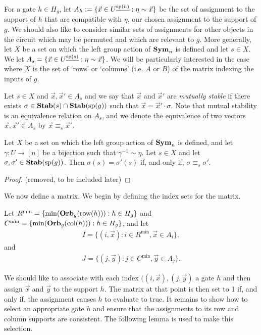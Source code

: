 \documentclass[../paper.tex]{subfiles}
\begin{document}
For a gate $h \in H_g$, let $A_h := \{\vec{x} \in U^{\underline{\text{sp}(h)}} :
\eta \sim \vec{x}\}$ be the set of assignment to the support of $h$ that are
compatible with $\eta$, our chosen assignment to the support of $g$. We should
also like to consider similar sets of assignments for other objects in the
circuit which may be permuted and which are relevant to $g$. More generally, let
$X$ be a set on which the left group action of $\text{\textbf{Sym}}_n$ is defined and let $s
\in X$. We let $A_s = \{\vec{x} \in U^{\underline{\text{sp}(s)}} : \eta \sim
\vec{x}\}$. We will be particularly interested in the case where $X$ is the set
of `rows' or `columns' (i.e. $A$ or $B$) of the matrix indexing the inputs of
$g$.

Let $s \in X$ and $\vec{x}, \vec{x}' \in A_s$ and we say that $\vec{x}$ and
$\vec{x}'$ are \emph{mutually stable} if there exists $\sigma \in \text{\textbf{Stab}}(s) \cap
\text{\textbf{Stab}} (\text{sp} (g))$ such that $\vec{x} = \vec{x}' \cdot \sigma$. Note that mutual
stability is an equivalence relation on $A_s$, and we denote the equivalence of
two vectors $\vec{x}, \vec{x}' \in A_s$ by $\vec{x} \equiv_s \vec{x}'$.

\begin{lem}
  Let $X$ be a set on which the left group action of $\text{\textbf{Sym}}_n$ is defined, and
  let $\gamma: U \rightarrow [n]$ be a bijection such that $\gamma^{-1} \sim
  \eta$. Let $s \in X$ and let $\sigma, \sigma' \in \text{\textbf{Stab}}(\text{sp}(g))$. Then
  $\sigma(s) = \sigma' (s)$ if, and only if, $\sigma \equiv_s \sigma'$.
  \label{lem:functions-well-defined}
\end{lem}

\begin{proof}
  (removed, to be included later)
\end{proof}

We now define a matrix. We begin by defining the index sets for the matrix.

Let $R^{\min} = \{\min (\text{\textbf{Orb}}_g(\text{row}(h))) : h \in H_g\}$ and $C^{\min} = \{ \min
(\text{\textbf{Orb}}_g (\text{col}(h))) : h \in H_g\}$, and let
\begin{align*}
  I = \{(i, \vec{x}): i \in R^{\min}, \vec{x} \in A_i\},
\end{align*}
and
\begin{align*}
  J = \{(j, \vec{y}): j \in C^{\min}, \vec{y} \in A_j\}.
\end{align*}

We should like to associate with each index $((i, \vec{x}), (j, \vec{y})$ a gate
$h$ and then assign $\vec{x}$ and $\vec{y}$ to the support $h$. The matrix at
that point is then set to 1 if, and only if, the assignment causes $h$ to
evaluate to true. It remains to show how to select an appropriate gate $h$ and
ensure that the assignments to its row and column supports are consistent. The
following lemma is used to make this selection.
\end{document}
